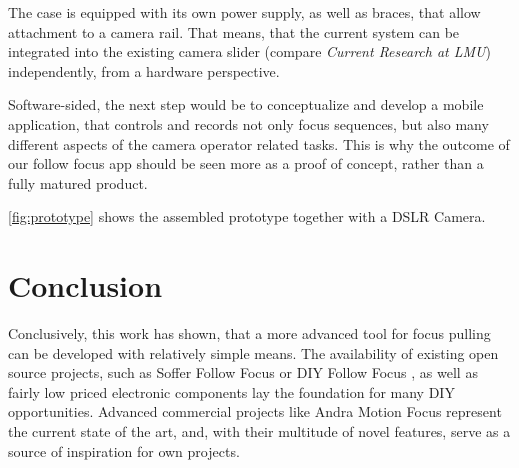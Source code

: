 \documentclass{sigchi}
\begin{document}
The case is equipped with its own power supply, as well as braces, that allow attachment to a camera rail. That means, that the current system can be integrated into the existing camera slider (compare \textit{Current Research at LMU}) independently, from a hardware perspective. 

Software-sided, the next step would be to conceptualize and develop a mobile application, that controls and records not only focus sequences, but also many different aspects of the camera operator related tasks. This is why the outcome of our follow focus app should be seen more as a proof of concept, rather than a fully matured product.

\autoref{fig:prototype} shows the assembled prototype together with a DSLR Camera.


\section{Conclusion}

Conclusively, this work has shown, that a more advanced tool for focus pulling can be developed with relatively simple means. The availability of existing open source projects, such as Soffer Follow Focus \cite{soffer} or DIY Follow Focus \cite{diyff}, as well as fairly low priced electronic components lay the foundation for many DIY opportunities. Advanced commercial projects like Andra Motion Focus \cite{andra} represent the current state of the art, and, with their multitude of novel features, serve as a source of inspiration for own projects.



\end{document}
